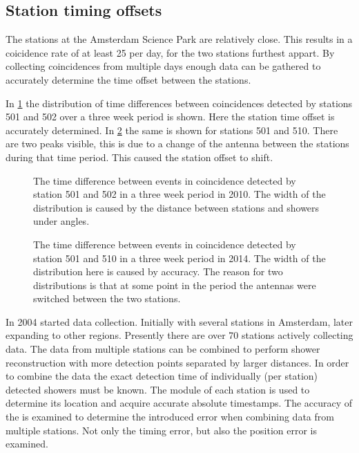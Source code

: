 \subsection{Station timing offsets}

The \hisparc stations at the Amsterdam Science Park are relatively close. This results in a coicidence rate of at least 25 per day, for the two stations furthest appart. By collecting coincidences from multiple days enough data can be gathered to accurately determine the time offset between the stations.

In \cref{fig:station_offsets_501_502} the distribution of time differences between coincidences detected by stations 501 and 502 over a three week period is shown. Here the station time offset is accurately determined. In \cref{fig:station_offsets_501_510} the same is shown for stations 501 and 510. There are two peaks visible, this is due to a change of the \gps antenna between the stations during that time period. This caused the station offset to shift.

\begin{figure}
    \centering
    
    \caption{ The
             time difference between events in coincidence detected by
             station 501 and 502 in a three week period in 2010. The
             width of the distribution is caused by the distance between
             stations and showers under angles.}
    \label{fig:station_offsets_501_502}
\end{figure}

\begin{figure}
    \centering
    
    \caption{ The
             time difference between events in coincidence detected by
             station 501 and 510 in a three week period in 2014. The
             width of the distribution here is caused by \gps accuracy.
             The reason for two distributions is that at some point in
             the period the \gps antennas were switched between the two
             stations.}
    \label{fig:station_offsets_501_510}
\end{figure}




In 2004 \hisparc started data collection. Initially with several stations in Amsterdam, later expanding to other regions. Presently there are over \num{70} \hisparc stations actively collecting data. The data from multiple \hisparc stations can be combined to perform shower reconstruction with more detection points separated by larger distances. In order to combine the data the exact detection time of individually (per station) detected showers must be known. The \gps module of each station is used to determine its location and acquire accurate absolute timestamps. The accuracy of the \gps is examined to determine the introduced error when combining data from multiple stations. Not only the timing error, but also the position error is examined.


